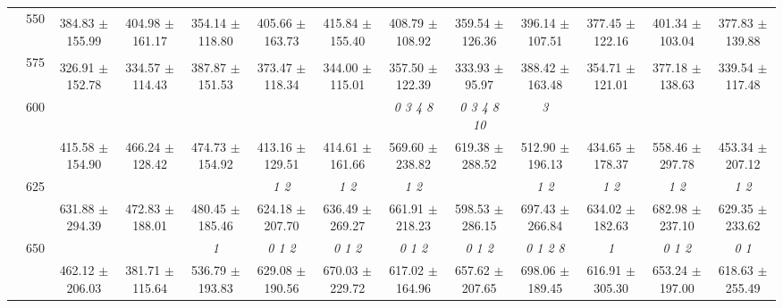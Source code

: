\begin{table}[h]
{\begin{tabular}{
        ccccccccccccc}
 & \multirow{2}{*}{550}& & & & & & & & & & &  \\ 
 & & 384.83 $\pm$ 155.99& 404.98 $\pm$ 161.17& 354.14 $\pm$ 118.80& 405.66 $\pm$ 163.73& 415.84 $\pm$ 155.40& 408.79 $\pm$ 108.92& 359.54 $\pm$ 126.36& 396.14 $\pm$ 107.51& 377.45 $\pm$ 122.16& 401.34 $\pm$ 103.04& 377.83 $\pm$ 139.88 \\ 
 & \multirow{2}{*}{575}& \cellcolor[HTML]{EFEFEF} & \cellcolor[HTML]{EFEFEF} & \cellcolor[HTML]{EFEFEF} & \cellcolor[HTML]{EFEFEF} & \cellcolor[HTML]{EFEFEF} & \cellcolor[HTML]{EFEFEF} & \cellcolor[HTML]{EFEFEF} & \cellcolor[HTML]{EFEFEF} & \cellcolor[HTML]{EFEFEF} & \cellcolor[HTML]{EFEFEF} & \cellcolor[HTML]{EFEFEF}  \\ 
 & & \cellcolor[HTML]{EFEFEF} 326.91 $\pm$ 152.78& \cellcolor[HTML]{EFEFEF} 334.57 $\pm$ 114.43& \cellcolor[HTML]{EFEFEF} 387.87 $\pm$ 151.53& \cellcolor[HTML]{EFEFEF} 373.47 $\pm$ 118.34& \cellcolor[HTML]{EFEFEF} 344.00 $\pm$ 115.01& \cellcolor[HTML]{EFEFEF} 357.50 $\pm$ 122.39& \cellcolor[HTML]{EFEFEF} 333.93 $\pm$ 95.97& \cellcolor[HTML]{EFEFEF} 388.42 $\pm$ 163.48& \cellcolor[HTML]{EFEFEF} 354.71 $\pm$ 121.01& \cellcolor[HTML]{EFEFEF} 377.18 $\pm$ 138.63& \cellcolor[HTML]{EFEFEF} 339.54 $\pm$ 117.48 \\ 
 & \multirow{2}{*}{600}& & & & & & \textit{ 0 3 4 8 }& \textit{  0  3  4  8 10 }& \textit{ 3 }& & &  \\ 
 & & 415.58 $\pm$ 154.90& 466.24 $\pm$ 128.42& 474.73 $\pm$ 154.92& 413.16 $\pm$ 129.51& 414.61 $\pm$ 161.66& 569.60 $\pm$ 238.82& 619.38 $\pm$ 288.52& 512.90 $\pm$ 196.13& 434.65 $\pm$ 178.37& 558.46 $\pm$ 297.78& 453.34 $\pm$ 207.12 \\ 
 & \multirow{2}{*}{625}& \cellcolor[HTML]{EFEFEF} & \cellcolor[HTML]{EFEFEF} & \cellcolor[HTML]{EFEFEF} & \cellcolor[HTML]{EFEFEF} \textit{ 1 2 }& \cellcolor[HTML]{EFEFEF} \textit{ 1 2 }& \cellcolor[HTML]{EFEFEF} \textit{ 1 2 }& \cellcolor[HTML]{EFEFEF} & \cellcolor[HTML]{EFEFEF} \textit{ 1 2 }& \cellcolor[HTML]{EFEFEF} \textit{ 1 2 }& \cellcolor[HTML]{EFEFEF} \textit{ 1 2 }& \cellcolor[HTML]{EFEFEF} \textit{ 1 2 } \\ 
 & & \cellcolor[HTML]{EFEFEF} 631.88 $\pm$ 294.39& \cellcolor[HTML]{EFEFEF} 472.83 $\pm$ 188.01& \cellcolor[HTML]{EFEFEF} 480.45 $\pm$ 185.46& \cellcolor[HTML]{EFEFEF} 624.18 $\pm$ 207.70& \cellcolor[HTML]{EFEFEF} 636.49 $\pm$ 269.27& \cellcolor[HTML]{EFEFEF} 661.91 $\pm$ 218.23& \cellcolor[HTML]{EFEFEF} 598.53 $\pm$ 286.15& \cellcolor[HTML]{EFEFEF} 697.43 $\pm$ 266.84& \cellcolor[HTML]{EFEFEF} 634.02 $\pm$ 182.63& \cellcolor[HTML]{EFEFEF} 682.98 $\pm$ 237.10& \cellcolor[HTML]{EFEFEF} 629.35 $\pm$ 233.62 \\ 
 & \multirow{2}{*}{650}& & & \textit{ 1 }& \textit{ 0 1 2 }& \textit{ 0 1 2 }& \textit{ 0 1 2 }& \textit{ 0 1 2 }& \textit{ 0 1 2 8 }& \textit{ 1 }& \textit{ 0 1 2 }& \textit{ 0 1 } \\ 
 & & 462.12 $\pm$ 206.03& 381.71 $\pm$ 115.64& 536.79 $\pm$ 193.83& 629.08 $\pm$ 190.56& 670.03 $\pm$ 229.72& 617.02 $\pm$ 164.96& 657.62 $\pm$ 207.65& 698.06 $\pm$ 189.45& 616.91 $\pm$ 305.30& 653.24 $\pm$ 197.00& 618.63 $\pm$ 255.49 \\ \midrule 


\end{tabular}}
\end{table}
